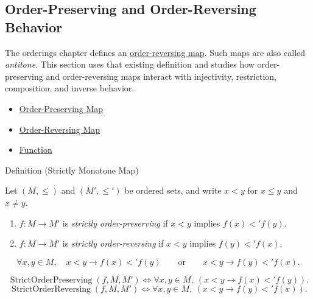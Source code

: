 
\subsection*{Order-Preserving and Order-Reversing Behavior}

\begin{remark*}[Exposition]
The orderings chapter defines an \hyperref[def:order-reversing-map]{order-reversing map}.
Such maps are also called \emph{antitone}. This section uses that existing
definition and studies how order-preserving and order-reversing maps interact
with injectivity, restriction, composition, and inverse behavior.
\end{remark*}

\begin{dependencies}
\begin{itemize}
  \item \hyperref[def:order-preserving-map-ordered-sets]{Order-Preserving Map}
  \item \hyperref[def:order-reversing-map]{Order-Reversing Map}
  \item \hyperref[def:function]{Function}
\end{itemize}
\end{dependencies}

\begin{definitionbox}{Definition (Strictly Monotone Map)}
\begin{definition}\label{def:strictly-monotone-map-functions-order}
Let $(M,\leq)$ and $(M',\leq')$ be ordered sets, and write $x<y$ for
$x\leq y$ and $x\neq y$.
\begin{enumerate}[label=(\roman*)]
\item $f:M\to M'$ is \emph{strictly order-preserving} if
$x<y$ implies $f(x)<' f(y)$.
\item $f:M\to M'$ is \emph{strictly order-reversing} if
$x<y$ implies $f(y)<' f(x)$.
\end{enumerate}
\end{definition}
\end{definitionbox}

\begin{remark*}
\[
  \forall x,y\in M,\quad
  x<y\to f(x)<'f(y)
  \qquad\text{or}\qquad
  x<y\to f(y)<'f(x).
\]
\end{remark*}

\begin{remark*}
\[
  \operatorname{StrictOrderPreserving}(f,M,M')
  \iff
  \forall x,y\in M,\ (x<y\to f(x)<'f(y)).
\]
\[
  \operatorname{StrictOrderReversing}(f,M,M')
  \iff
  \forall x,y\in M,\ (x<y\to f(y)<'f(x)).
\]
\end{remark*}

